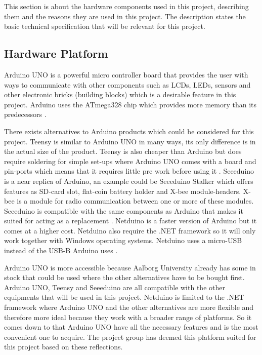 \label{sec:Hardware}
This section is about the hardware components used in this project, describing them and the reasons they are used in this project. The description states the basic technical specification that will be relevant for this project.

\subsection{Hardware Platform}
\label{sec:hardwarearduino}
Arduino UNO is a powerful micro controller board that provides the user with ways to communicate with other components such as LCDs, LEDs, sensors and other electronic bricks (building blocks) which is a desirable feature in this project. Arduino uses the ATmega328 chip which provides more memory than its predecessors \citep{ArduinoUno}.

There exists alternatives to Arduino products which could be considered for this project. Teensy is similar to Arduino UNO in many ways, its only difference is in the actual size of the product. Teensy is also cheaper than Arduino but does require soldering for simple set-ups where Arduino UNO comes with a board and pin-ports which means that it requires little pre work before using it \citep{Teensy}.
Seeeduino is a near replica of Arduino, an example could be Seeeduino Stalker which offers features as SD-card slot, flat-coin battery holder and X-bee module-headers. X-bee is a module for radio communication between one or more of these modules. Seeeduino is compatible with the same components as 
Arduino that makes it suited for acting as a replacement \citep{Seedui}.
Netduino is a faster version of Arduino but it comes at a higher cost. Netduino also require the .NET framework so it will only work together with Windows operating systems. Netduino uses a micro-USB instead of the USB-B Arduino uses \citep{Netdui}.

Arduino UNO is more accessible because Aalborg University already has some in stock that could be used where the other alternatives have to be bought first. Arduino UNO, Teensy and Seeeduino are all compatible with the other equipments that will be used in this project. Netduino is limited to the .NET framework where Arduino UNO and the other alternatives are more flexible and therefore more ideal because they work with a broader range of platforms.
So it comes down to that Arduino UNO have all the necessary features and is the most convenient one to acquire. The project group has deemed this platform suited for this project based on these reflections. 

